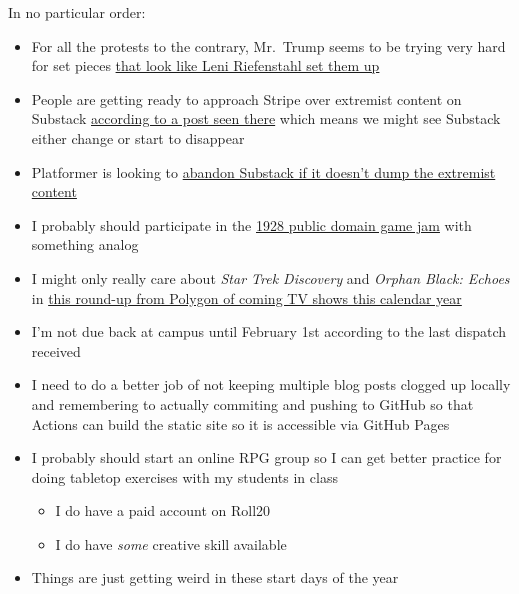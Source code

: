 In no particular order:

\begin{itemize}
\tightlist
\item
  For all the protests to the contrary, Mr.~Trump seems to be trying
  very hard for set pieces
  \href{https://web.archive.org/web/20240103053551/https://substack.com/@deanobeidallah/note/c-46469043?r=2k3po}{that
  look like Leni Riefenstahl set them up}
\item
  People are getting ready to approach Stripe over extremist content on
  Substack
  \href{https://web.archive.org/web/20240103054921/https://substack.com/@noahberlatsky/note/c-46498513}{according
  to a post seen there} which means we might see Substack either change
  or start to disappear
\item
  Platformer is looking to
  \href{https://web.archive.org/web/20240103055409/https://substack.com/@thehandbasket/note/c-46497901}{abandon
  Substack if it doesn't dump the extremist content}
\item
  I probably should participate in the
  \href{https://web.archive.org/web/20240103021523/https://itch.io/jam/gaming-like-its-1928}{1928
  public domain game jam} with something analog
\item
  I might only really care about \emph{Star Trek Discovery} and
  \emph{Orphan Black: Echoes} in
  \href{https://web.archive.org/web/20240102174045/https://www.polygon.com/24007774/best-new-tv-2024-release-calendar-schedule-shows-series}{this
  round-up from Polygon of coming TV shows this calendar year}
\item
  I'm not due back at campus until February 1st according to the last
  dispatch received
\item
  I need to do a better job of not keeping multiple blog posts clogged
  up locally and remembering to actually commiting and pushing to GitHub
  so that Actions can build the static site so it is accessible via
  GitHub Pages
\item
  I probably should start an online RPG group so I can get better
  practice for doing tabletop exercises with my students in class

  \begin{itemize}
  \tightlist
  \item
    I do have a paid account on Roll20
  \item
    I do have \emph{some} creative skill available
  \end{itemize}
\item
  Things are just getting weird in these start days of the year
\end{itemize}
